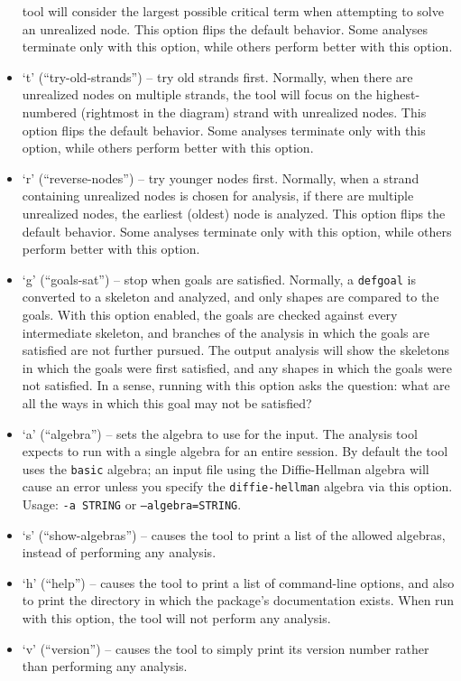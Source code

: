 \begin{itemize}
  tool will consider the largest possible critical term when attempting
  to solve an unrealized node.  This option flips the default behavior.
  Some analyses terminate only with this option, while others perform
  better with this option.
 
\item `t' (``try-old-strands'') -- try old strands first.  Normally,
  when there are unrealized nodes on multiple strands, the tool will
  focus on the highest-numbered (rightmost in the diagram) strand with
  unrealized nodes.  This option flips the default behavior.  Some
  analyses terminate only with this option, while others perform
  better with this option.
 
\item `r' (``reverse-nodes'') -- try younger nodes first.  Normally,
  when a strand containing unrealized nodes is chosen for analysis, if
  there are multiple unrealized nodes, the earliest (oldest) node is
  analyzed.  This option flips the default behavior.  Some analyses
  terminate only with this option, while others perform better with
  this option.
 
\item `g' (``goals-sat'') -- stop when goals are satisfied.  Normally,
  a \texttt{defgoal} is converted to a skeleton and analyzed, and only
  shapes are compared to the goals.  With this option enabled, the
  goals are checked against every intermediate skeleton, and branches
  of the analysis in which the goals are satisfied are not further
  pursued.  The output analysis will show the skeletons in which the
  goals were first satisfied, and any shapes in which the goals were
  not satisfied.  In a sense, running {\cpsa} with this option asks
  the question: what are all the ways in which this goal may not be
  satisfied?
  
\item `a' (``algebra'') -- sets the algebra to use for the input.  The
  analysis tool expects to run with a single algebra for an entire
  session.  By default the tool uses the \texttt{basic} algebra; an
  input file using the Diffie-Hellman algebra will cause an error
  unless you specify the \texttt{diffie-hellman} algebra via this
  option.
  Usage: \texttt{-a STRING} or \texttt{--algebra=STRING}.
\item `s' (``show-algebras'') -- causes the tool to print a list of the
  allowed algebras, instead of performing any analysis.
\item `h' (``help'') -- causes the tool to print a list of
  command-line options, and also to print the directory in which the
  package's documentation exists.  When run with this option, the tool
  will not perform any analysis.
\item `v' (``version'') -- causes the tool to simply print its version
  number rather than performing any analysis.

\end{itemize}

